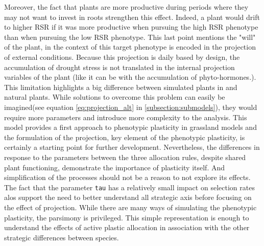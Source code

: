 Moreover, the fact that plants are more productive during periods where they may not want to invest in roots strengthen this effect. Indeed, a plant would drift to higher RSR if it was more productive when pursuing the high RSR phenotype than when pursuing the low RSR phenotype. This last point mentions the "will" of the plant, in the context of \model this target phenotype is encoded in the projection of external conditions. Because this projection is daily based by design, the accumulation of drought stress is not translated in the internal projection variables of the plant (like it can be with the accumulation of phyto-hormones.). This limitation highlights a big difference between simulated plants in \model and natural plants. While solutions to overcome this problem can easily be imagined(see equation \ref{eq:projection_alt} in \ref{subsection:submodels}), they would require more parameters and introduce more complexity to the analysis. This model provides a first approach to phenotypic plasticity in grassland models and the formulation of the projection, key element of the phenotypic plasticity, is certainly a starting point for further development. Nevertheless, the differences in response to the parameters between the three allocation rules, despite shared plant functioning, demonstrate the importance of plasticity itself. And simplification of the processes should not be a reason to not explore its effects. The fact that the parameter \texttt{tau} has a relatively small impact on selection rates alos support the need to better understand all strategic axis before focusing on the effect of projection. While there are many ways of simulating the phenotypic plasticity, the parsimony is privileged. This simple representation is enough to understand the effects of active plastic allocation in association with the other strategic differences between species.




